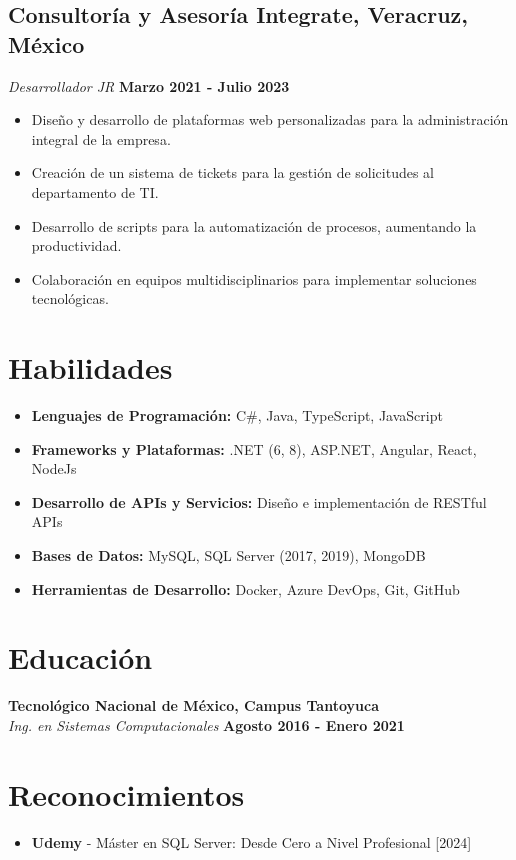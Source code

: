 \documentclass[a4paper,10pt]{article}
\begin{document}
\subsection*{Consultoría y Asesoría Integrate, Veracruz, México}
\textit{Desarrollador JR} \hfill \textbf{Marzo 2021 - Julio 2023}
\begin{itemize}[left=0em]
    \item Diseño y desarrollo de plataformas web personalizadas para la administración integral de la empresa.
    \item Creación de un sistema de tickets para la gestión de solicitudes al departamento de TI.
    \item Desarrollo de scripts para la automatización de procesos, aumentando la productividad.
    \item Colaboración en equipos multidisciplinarios para implementar soluciones tecnológicas.
\end{itemize}

\section*{Habilidades}
\begin{itemize}[left=0em]
    \item \textbf{Lenguajes de Programación:} C\#, Java, TypeScript, JavaScript
    \item \textbf{Frameworks y Plataformas:} .NET (6, 8), ASP.NET, Angular, React, NodeJs
    \item \textbf{Desarrollo de APIs y Servicios:} Diseño e implementación de RESTful APIs
    \item \textbf{Bases de Datos:} MySQL, SQL Server (2017, 2019), MongoDB
    \item \textbf{Herramientas de Desarrollo:} Docker, Azure DevOps, Git, GitHub
\end{itemize}

\section*{Educación}
\textbf{Tecnológico Nacional de México, Campus Tantoyuca} \\
\textit{Ing. en Sistemas Computacionales} \hfill \textbf{Agosto 2016 - Enero 2021}

\section*{Reconocimientos}
\begin{itemize}[left=0em]
    \item \textbf{Udemy} - Máster en SQL Server: Desde Cero a Nivel Profesional [2024]
\end{itemize}
\end{document}
